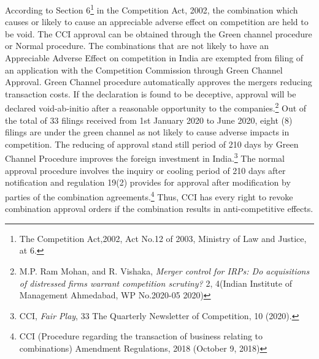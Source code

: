 \begin{multicols}{2}

\noi
According to Section 6\footnote{The Competition Act,2002, Act No.12 of 2003, Ministry of Law and Justice, at 6.} in the Competition Act, 2002, the combination which causes or
likely to cause an appreciable adverse effect on competition are held to be void. The CCI
approval can be obtained through the Green channel procedure or Normal procedure. The
combinations that are not likely to have an Appreciable Adverse Effect on competition in
India are exempted from filing of an application with the Competition Commission through
Green Channel Approval. Green Channel procedure automatically approves the mergers
reducing transaction costs. If the declaration is found to be deceptive, approval will be
declared void-ab-initio after a reasonable opportunity to the companies.\footnote{M.P. Ram Mohan, and R. Vishaka, \textit{Merger control for IRPs: Do acquisitions of distressed firms warrant
competition scrutiny?} 2, 4(Indian Institute of Management Ahmedabad, WP No.2020-05 2020)} Out of the total of
33 filings received from 1st January 2020 to June 2020, eight (8) filings are under the green
channel as not likely to cause adverse impacts in competition. The reducing of approval stand
still period of 210 days by Green Channel Procedure improves the foreign investment in
India.\footnote{CCI, \textit{Fair Play}, 33 The Quarterly Newsletter of Competition, 10 (2020).} The normal approval procedure involves the inquiry or cooling period of 210 days
after notification and regulation 19(2) provides for approval after modification by parties of
the combination agreements.\footnote{CCI (Procedure regarding the transaction of business relating to combinations) Amendment Regulations,
2018 (October 9, 2018)} Thus, CCI has every right to revoke combination approval
orders if the combination results in anti-competitive effects.
\smallskip



\end{multicols}
